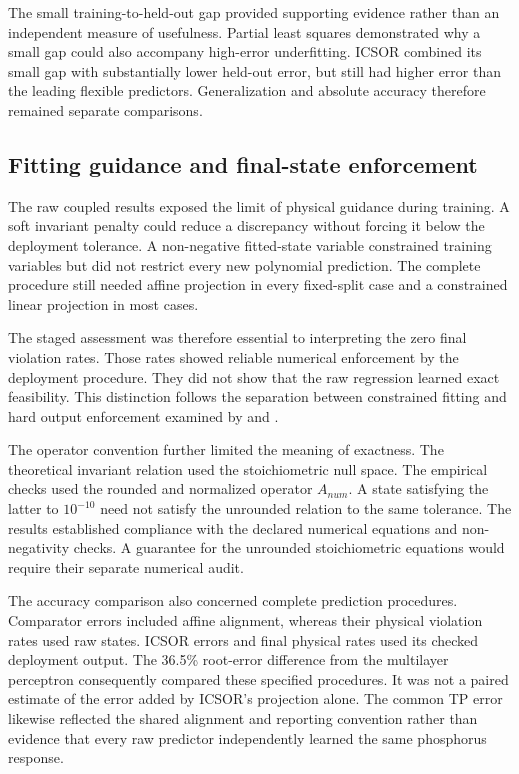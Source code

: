 The small training-to-held-out gap provided supporting evidence rather than an independent measure of usefulness. Partial least squares demonstrated why a small gap could also accompany high-error underfitting. ICSOR combined its small gap with substantially lower held-out error, but still had higher error than the leading flexible predictors. Generalization and absolute accuracy therefore remained separate comparisons.

\subsection{Fitting guidance and final-state enforcement}

The raw coupled results exposed the limit of physical guidance during training. A soft invariant penalty could reduce a discrepancy without forcing it below the deployment tolerance. A non-negative fitted-state variable constrained training variables but did not restrict every new polynomial prediction. The complete procedure still needed affine projection in every fixed-split case and a constrained linear projection in most cases.

The staged assessment was therefore essential to interpreting the zero final violation rates. Those rates showed reliable numerical enforcement by the deployment procedure. They did not show that the raw regression learned exact feasibility. This distinction follows the separation between constrained fitting and hard output enforcement examined by \citet{Hansen2024} and \citet{KircherVotsmeier2025}.

The operator convention further limited the meaning of exactness. The theoretical invariant relation used the stoichiometric null space. The empirical checks used the rounded and normalized operator $A_{num}$. A state satisfying the latter to $10^{-10}$ need not satisfy the unrounded relation to the same tolerance. The results established compliance with the declared numerical equations and non-negativity checks. A guarantee for the unrounded stoichiometric equations would require their separate numerical audit.

The accuracy comparison also concerned complete prediction procedures. Comparator errors included affine alignment, whereas their physical violation rates used raw states. ICSOR errors and final physical rates used its checked deployment output. The 36.5\% root-error difference from the multilayer perceptron consequently compared these specified procedures. It was not a paired estimate of the error added by ICSOR's projection alone. The common TP error likewise reflected the shared alignment and reporting convention rather than evidence that every raw predictor independently learned the same phosphorus response.

